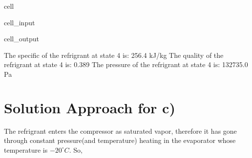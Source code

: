 \documentclass[letterpaper,10pt,english]{jupyterBook}
\begin{document}
\begin{sphinxuseclass}{cell}
\begin{sphinxVerbatimInput}
\begin{sphinxuseclass}{cell_input}
\begin{sphinxVerbatim}[commandchars=\\\{\}]
  
 
  
\end{sphinxVerbatim}

\end{sphinxuseclass}\end{sphinxVerbatimInput}
\begin{sphinxVerbatimOutput}

\begin{sphinxuseclass}{cell_output}
\begin{sphinxVerbatim}[commandchars=\\\{\}]
The specific of the refrigrant at state \PYGZsh{}4 is: 256.4 kJ/kg
The quality of the refrigrant at state \PYGZsh{}4 is: 0.389
The pressure of the refrigrant at state \PYGZsh{}4 is: 132735.0 Pa
\end{sphinxVerbatim}

\end{sphinxuseclass}\end{sphinxVerbatimOutput}

\end{sphinxuseclass}

\section{Solution Approach for c)}
\label{\detokenize{notebooks/Chapter5/CH5-Q5:solution-approach-for-c}}
\sphinxAtStartPar
The refrigrant enters the compressor as saturated vapor, therefore it has gone through constant pressure(and temperature) heating in the evaporator whose temperature is \(-20^{\circ}  C\). So,
\end{document}
